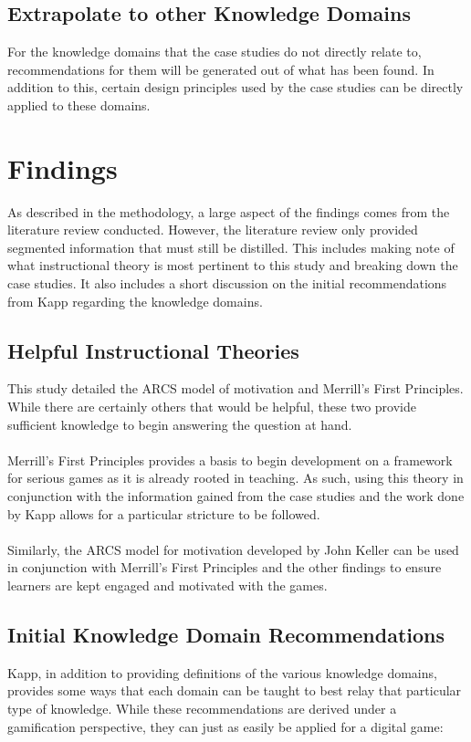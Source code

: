 \documentclass[conference]{IEEEtran}
\begin{document}
\subsection{Extrapolate to other Knowledge Domains}
For the knowledge domains that the case studies do not directly relate to, recommendations for them will be generated out of what has been found. In addition to this, certain design principles used by the case studies can be directly applied to these domains.

\section{Findings}
As described in the methodology, a large aspect of the findings comes from the literature review conducted. However, the literature review only provided segmented information that must still be distilled. This includes making note of what instructional theory is most pertinent to this study and breaking down the case studies. It also includes a short discussion on the initial recommendations from Kapp\cite{Kapp2012a} regarding the knowledge domains.

\subsection{Helpful Instructional Theories}
This study detailed the ARCS model of motivation and Merrill's First Principles. While there are certainly others that would be helpful, these two provide sufficient knowledge to begin answering the question at hand. 
\\\\
Merrill's First Principles\cite{Merrill2002} provides a basis to begin development on a framework for serious games as it is already rooted in teaching. As such, using this theory in conjunction with the information gained from the case studies and the work done by Kapp\cite{Kapp2012a} allows for a particular stricture to be followed.
\\\\
Similarly, the ARCS model for motivation developed by John Keller\cite{keller1987development} can be used in conjunction with Merrill's First Principles and the other findings to ensure learners are kept engaged and motivated with the games.

\subsection{Initial Knowledge Domain Recommendations}
Kapp\cite{Kapp2012a}, in addition to providing definitions of the various knowledge domains, provides some ways that each domain can be taught to best relay that particular type of knowledge. While these recommendations are derived under a gamification perspective\cite{Kapp2012a}, they can just as easily be applied for a digital game:
\end{document}
